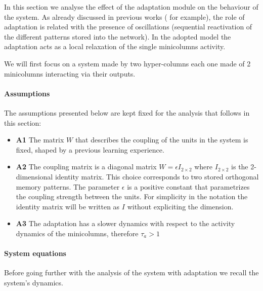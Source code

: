 In this section we analyse the effect of the adaptation module on the behaviour of the system. As already discussed in previous works (\cite{sandberg2002bayesian} for example), the role of adaptation is related with the presence of oscillations (sequential reactivation of the different patterns stored into the network). In the adopted model \cite{LansnerFRC} the adaptation acts as a local relaxation of the single minicolumns activity. 
 
 We will first focus on a system made by two hyper-columns each one made of 2 minicolumns interacting via their outputs.
 
 \paragraph{Assumptions}
 The assumptions presented below are kept fixed for the analysis that follows in this section:
 \begin{itemize}
     \item \textbf{A1} The matrix $W$ that describes the coupling of the units in the system is fixed, shaped by a previous learning experience.
     \item \textbf{A2} The coupling matrix is a diagonal matrix $W = \epsilon  I_{2 \times 2}$ where $I_{2 \times 2}$ is the 2-dimensional identity matrix. This choice corresponds to two stored orthogonal memory patterns. The parameter $\epsilon$ is a positive constant that parametrizes the coupling strength between the units. For simplicity in the notation the identity matrix will be written as $I$ without expliciting the dimension.
     \item \textbf{A3} The adaptation has a slower dynamics with respect to the activity dynamics of the minicolumns, therefore $\tau_a > 1$
 \end{itemize}
 
 \paragraph{System equations}
 Before going further with the analysis of the system with adaptation we recall the system's dynamics.
 
